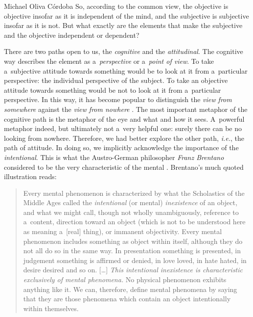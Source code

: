 \begin{artengenv}{Michael Oliva Córdoba}
\noindent So, according to the common view, the objective is objective insofar as it is independent of the mind, and the subjective is subjective insofar as it is not. But what exactly are the elements that make the subjective and the objective independent or dependent?



There are two paths open to us, the \textit{cognitive} and the \textit{attitudinal}. The cognitive way describes the element as a~\textit{perspective} or a~\textit{point of view}. To take a~subjective attitude towards something would be to look at it from a~particular perspective: the individual perspective of the subject. To take an objective attitude towards something would be not to look at it from a~particular perspective. In this way, it has become popular to distinguish the \textit{view from somewhere} against the \textit{view from nowhere} 
\parencite[cf.][]{nagel_subjective_1979}. %
 The most important metaphor of the cognitive path is the metaphor of the eye and what and how it sees. A~powerful metaphor indeed, but ultimately not a~very helpful one: surely there can be no looking from nowhere. Therefore, we had better explore the other path, \textit{i.e.}, the path of attitude. In doing so, we implicitly acknowledge the importance of the \textit{intentional}. This is what the Austro-German philosopher \textit{Franz Brentano} considered to be the very characteristic of the mental 
\parencites[see, e.g.,][]{ohear_intentionality_1998}[][]{crane_elements_2001}[][]{crane_objects_2013}. %
 Brentano's much quoted illustration reads:



\begin{quote}
	Every mental phenomenon is characterized by what the Scholastics of the Middle Ages called the \textit{intentional} (or mental) \textit{inexistence} of an object, and what we might call, though not wholly unambiguously, reference to a~content, direction toward an object (which is not to be understood here as meaning a~[real] thing), or immanent objectivity. Every mental phenomenon includes something as object within itself, although they do not all do so in the same way. In presentation something is presented, in judgement something is affirmed or denied, in love loved, in hate hated, in desire desired and so on. […] \textit{This intentional inexistence is characteristic exclusively of mental phenomena.} No physical phenomenon exhibits anything like it. We can, therefore, define mental phenomena by saying that they are those phenomena which contain an object intentionally within themselves. 
	\parencites[][p.68]{brentano_psychology_2009}[orig.][emphasis added]{brentano_psychologie_1874}%
\end{quote}




\end{artengenv}
